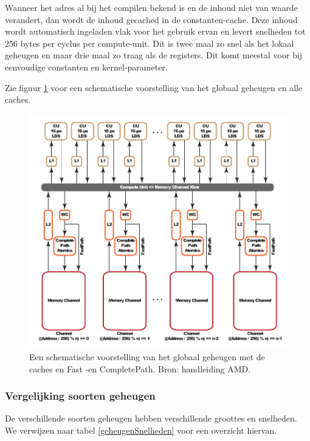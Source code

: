 Wanneer het adres al bij het compilen bekend is en de inhoud niet van waarde verandert, dan wordt de inhoud gecached in de constanten-cache. Deze inhoud wordt automatisch ingeladen vlak voor het gebruik ervan en levert snelheden tot 256 bytes per cyclus per compute-unit. Dit is twee maal zo snel als het lokaal geheugen en maar drie maal zo traag als de registers. Dit komt meestal voor bij eenvoudige constanten en kernel-parameter.

Zie figuur \ref{geheugen6970} voor een schematische voorstelling van het globaal geheugen en alle caches.

\begin{figure}
\centering
\includegraphics{geheugen6970}
\caption{\label{geheugen6970}Een schematische voorstelling van het globaal geheugen met de caches en Fast -en CompletePath. Bron: handleiding AMD\cite[p.~6-2]{amd}.}
\end{figure}

\subsubsection{Vergelijking soorten geheugen}
De verschillende soorten geheugen hebben verschillende groottes en snelheden. We verwijzen naar tabel \ref{geheugenSnelheden} voor een overzicht hiervan.

